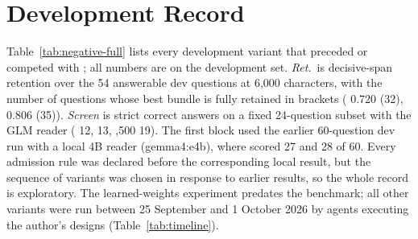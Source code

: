\section{Development Record}
\label{app:negative}



Table~\ref{tab:negative-full} lists every development variant that preceded or competed with \lexb{}; all numbers are on the development set. \emph{Ret.}\ is decisive-span retention over the 54 answerable dev questions at 6,000 characters, with the number of questions whose best bundle is fully retained in brackets (\hybrid{} 0.720 (32), \hr{} 0.806 (35)). \emph{Screen} is strict correct answers on a fixed 24-question subset with the GLM reader (\hybrid{} 12, \hr{} 13, ,500 19). The first block used the earlier 60-question dev run with a local 4B reader (gemma4:e4b), where \hybrid{} scored 27 and \hr{} 28 of 60. Every admission rule was declared before the corresponding local result, but the sequence of variants was chosen in response to earlier results, so the whole record is exploratory. The learned-weights experiment predates the benchmark; all other variants were run between 25 September and 1 October 2026 by agents executing the author's designs (Table~\ref{tab:timeline}).

